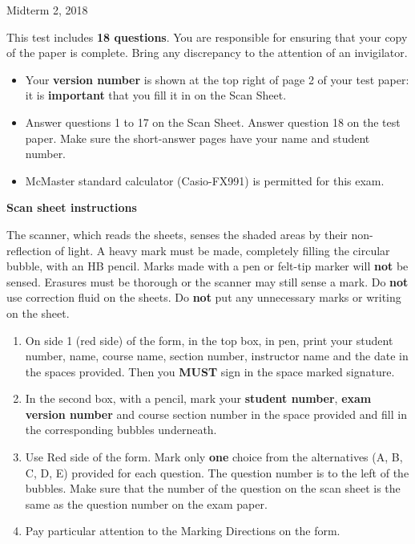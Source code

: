 \documentclass[12pt]{article}
\begin{document}
{ \par}
{\centering Midterm 2, 2018 \par}

\parindent0pt

\vfill

This test includes {\bf 18 questions}. You are responsible for ensuring that your copy of the paper is complete. Bring any discrepancy to the attention of an invigilator. 

\vfill

\begin{itemize}
\item Your \textbf{version number} is shown at the top right of page 2 of your test paper: it is \textbf{important} that you fill it in on the Scan Sheet.
\item Answer questions 1 to 17 on the Scan Sheet. Answer question 18 on the test paper. Make sure the short-answer pages have your name and student number.
\item McMaster standard calculator (Casio-FX991) is permitted for this exam.
\end{itemize}

\vfill

\textbf{Scan sheet instructions}

\small{
The scanner, which reads the sheets, senses the shaded areas by their non-reflection of light. A heavy mark must be made, completely filling the circular bubble, with an HB pencil. Marks made with a pen or felt-tip marker will \textbf{not} be sensed. Erasures must be thorough or the scanner may still sense a mark. Do \textbf{not} use correction fluid on the sheets. Do \textbf{not} put any unnecessary marks or writing on the sheet.

\begin{enumerate}
\item On side 1 (red side) of the form, in the top box, in pen, print your student number, name, course name, section number, instructor name and the date in the spaces provided. Then you {\bf MUST} sign in the space marked signature.

\item In the second box, with a pencil, mark your {\bf student number}, {\bf exam version number} and course section number in the space provided and fill in the corresponding bubbles underneath.

\item Use Red side of the form. Mark only {\bf one} choice from the alternatives (A, B, C, D, E) provided for each question. The question number is to the left of the bubbles. Make sure that the number of the question on the scan sheet is the same as the question number on the exam paper.
\item  Pay particular attention to the Marking Directions on the form.
\end{enumerate}
}

\vfill
{ \par}
\end{document}
